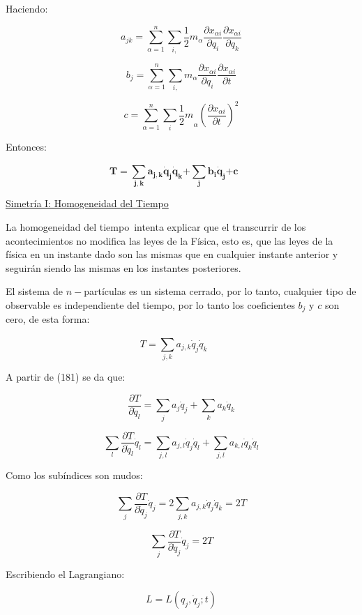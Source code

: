 \documentclass[]{article}
\begin{document}
Haciendo:

\[a_{jk} = \sum_{\alpha = 1}^{n}{\sum_{i,}^{}{\frac{1}{2}m_{\alpha}}}\frac{\partial x_{\alpha i}}{\partial q_{i}}\frac{\partial x_{\alpha i}}{\partial q_{k}}\]

\[b_{j} = \sum_{\alpha = 1}^{n}{\sum_{i,}^{}{m_{\alpha}\frac{\partial x_{\alpha i}}{\partial q_{i}}\frac{\partial x_{\alpha i}}{\partial t}}}\]

\[c = {\sum_{\alpha = 1}^{n}{\sum_{i}^{}{{\frac{1}{2}m}_{\alpha}\left( \frac{\partial x_{\alpha i}}{\partial t} \right)}}}^{2}\]

Entonces:

\[\mathbf{T =}\sum_{\mathbf{j,k}}^{}{\mathbf{a}_{\mathbf{j,k}}{\dot{\mathbf{q}}}_{\mathbf{j}}}{\dot{\mathbf{q}}}_{\mathbf{k}}\mathbf{+}\sum_{\mathbf{j}}^{}\mathbf{b}_{\mathbf{i}}{\dot{\mathbf{q}}}_{\mathbf{j}}\mathbf{+ c\ \ \ \ \ \ \ }\]

\uline{Simetría I: Homogeneidad del Tiempo}

La homogeneidad del tiempo~intenta explicar que el transcurrir de los
acontecimientos no modifica las leyes de la Física, esto es, que las
leyes de la física en un instante dado son las mismas que en cualquier
instante anterior y seguirán siendo las mismas en los instantes
posteriores.

El sistema de \(n -\)partículas es un sistema cerrado, por lo tanto,
cualquier tipo de observable es independiente del tiempo, por lo tanto
los coeficientes \(b_{j}\) y \(c\) son cero, de esta forma:

\[T = \sum_{j,k}^{}{a_{j,k}{\dot{q}}_{j}}{\dot{q}}_{k}\ \ \ \ \ \ \ \]

A partir de (181) se da que:

\[\frac{\partial T}{\partial{\dot{q}}_{l}} = \sum_{j}^{}{a_{j}{\dot{q}}_{j}} + \sum_{k}^{}a_{k}{\dot{q}}_{k}\]

\[\sum_{l}^{}\frac{\partial T}{\partial{\dot{q}}_{l}}{\dot{q}}_{l} = \sum_{j,l}^{}{a_{j,l}{\dot{q}}_{j}}{\dot{q}}_{l} + \sum_{j,l}^{}{a_{k,l}{\dot{q}}_{k}}{\dot{q}}_{l}\]

Como los subíndices son mudos:

\[\sum_{j}^{}\frac{\partial T}{\partial{\dot{q}}_{j}}{\dot{q}}_{j} = 2\sum_{j,k}^{}{a_{j,k}{\dot{q}}_{j}}{\dot{q}}_{k} = 2T\]

\[\sum_{j}^{}{\frac{\partial T}{\partial{\dot{q}}_{j}}{\dot{q}}_{j} = 2T}\]

Escribiendo el Lagrangiano:

\[L = L\left( q_{j},{\dot{q}}_{j};t \right)\]
\end{document}
